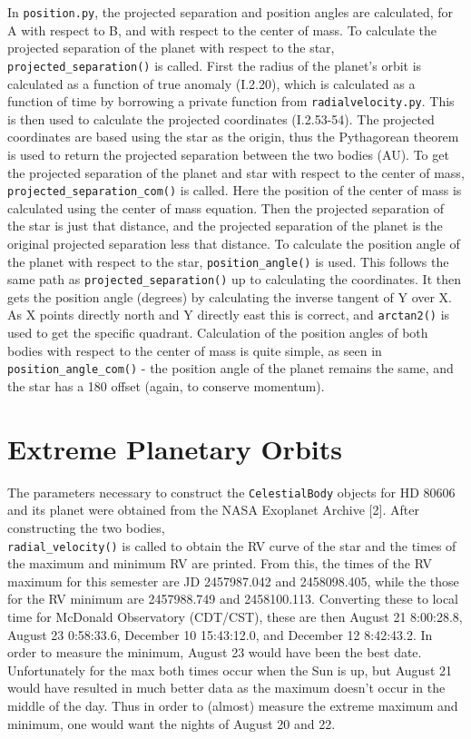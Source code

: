 \documentclass[12pt]{article}
\begin{document}
\indent In \texttt{position.py}, the projected separation and position angles are calculated, for A with respect to B, and with respect to the center of mass. To calculate the projected separation of the planet with respect to the star, \texttt{projected\_separation()} is called. First the radius of the planet's orbit is calculated as a function of true anomaly (I.2.20), which is calculated as a function of time by borrowing a private function from \texttt{radialvelocity.py}. This is then used to calculate the projected coordinates (I.2.53-54). The projected coordinates are based using the star as the origin, thus the Pythagorean theorem is used to return the projected separation between the two bodies (AU). To get the projected separation of the planet and star with respect to the center of mass, \texttt{projected\_separation\_com()} is called. Here the position of the center of mass is calculated using the center of mass equation. Then the projected separation of the star is just that distance, and the projected separation of the planet is the original projected separation less that distance. To calculate the position angle of the planet with respect to the star, \texttt{position\_angle()} is used. This follows the same path as \texttt{projected\_separation()} up to calculating the coordinates. It then gets the position angle (degrees) by calculating the inverse tangent of Y over X. As X points directly north and Y directly east this is correct, and \texttt{arctan2()} is used to get the specific quadrant. Calculation of the position angles of both bodies with respect to the center of mass is quite simple, as seen in \texttt{position\_angle\_com()} - the position angle of the planet remains the same, and the star has a 180{\degree} offset (again, to conserve momentum).


\section{Extreme Planetary Orbits}
The parameters necessary to construct the \texttt{CelestialBody} objects for HD 80606 and its planet were obtained from the NASA Exoplanet Archive [2]. After constructing the two bodies, \\\texttt{radial\_velocity()} is called to obtain the RV curve of the star and the times of the maximum and minimum RV are printed. From this, the times of the RV maximum for this semester are JD 2457987.042 and 2458098.405, while the those for the RV minimum are 2457988.749 and 2458100.113. Converting these to local time for McDonald Observatory (CDT/CST), these are then August 21 8:00:28.8, August 23 0:58:33.6, December 10 15:43:12.0, and December 12 8:42:43.2. In order to measure the minimum, August 23 would have been the best date. Unfortunately for the max both times occur when the Sun is up, but August 21 would have resulted in much better data as the maximum doesn't occur in the middle of the day. Thus in order to (almost) measure the extreme maximum and minimum, one would want the nights of August 20 and 22. 
\end{document}
